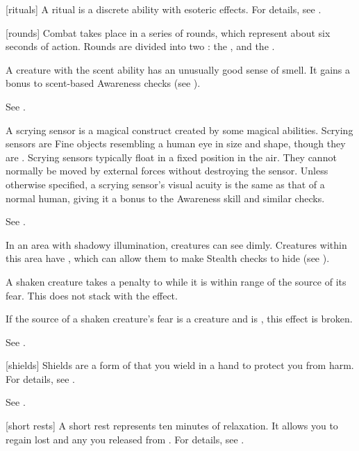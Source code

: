 [rituals] A ritual is a discrete  ability with esoteric effects.
For details, see .

[rounds] Combat takes place in a series of rounds, which represent about six seconds of action.
Rounds are divided into two : the , and the .

 A creature with the scent ability has an unusually good sense of smell.
It gains a  bonus to scent-based Awareness checks (see ).

 See .

 A scrying sensor is a magical construct created by some magical abilities.
Scrying sensors are Fine objects resembling a human eye in size and shape, though they are .
Scrying sensors typically float in a fixed position in the air.
They cannot normally be moved by external forces without destroying the sensor.
Unless otherwise specified, a scrying sensor's visual acuity is the same as that of a normal human, giving it a  bonus to the Awareness skill and similar checks.

 See .

 In an area with shadowy illumination, creatures can see dimly.
Creatures within this area have \concealment, which can allow them to make Stealth checks to hide (see ).

 A shaken creature takes a  penalty to  while it is within \rngclose range of the source of its fear.
This does not stack with the  effect.

If the source of a shaken creature's fear is a creature and is , this effect is broken.

 See .

[shields] Shields are a form of  that you wield in a hand to protect you from harm.
For details, see .

 See .

[short rests] A short rest represents ten minutes of relaxation.
It allows you to regain lost  and any  you released from .
For details, see .


